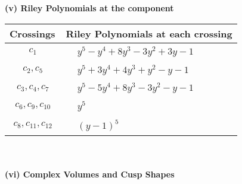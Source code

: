 \documentclass[1p]{elsarticle_modified}
\theoremstyle{definition}
\begin{document}
\newpage\renewcommand{\arraystretch}{1}
\flushleft \textbf{(v) Riley Polynomials at the component}\newline \\
\begin{tabular}{m{50pt}|m{274pt}}
Crossings & \hspace{64pt}Riley Polynomials at each crossing \\
\hline $$\begin{aligned}c_{1}\end{aligned}$$&$\begin{aligned}
&y^5- y^4+8 y^3-3 y^2+3 y-1
\end{aligned}$\\
\hline $$\begin{aligned}c_{2},c_{5}\end{aligned}$$&$\begin{aligned}
&y^5+3 y^4+4 y^3+y^2- y-1
\end{aligned}$\\
\hline $$\begin{aligned}c_{3},c_{4},c_{7}\end{aligned}$$&$\begin{aligned}
&y^5-5 y^4+8 y^3-3 y^2- y-1
\end{aligned}$\\
\hline $$\begin{aligned}c_{6},c_{9},c_{10}\end{aligned}$$&$\begin{aligned}
&y^5
\end{aligned}$\\
\hline $$\begin{aligned}c_{8},c_{11},c_{12}\end{aligned}$$&$\begin{aligned}
&(y-1)^5
\end{aligned}$\\
\hline
\end{tabular}\\~\\
\newpage\flushleft \textbf{(vi) Complex Volumes and Cusp Shapes}
\end{document}
